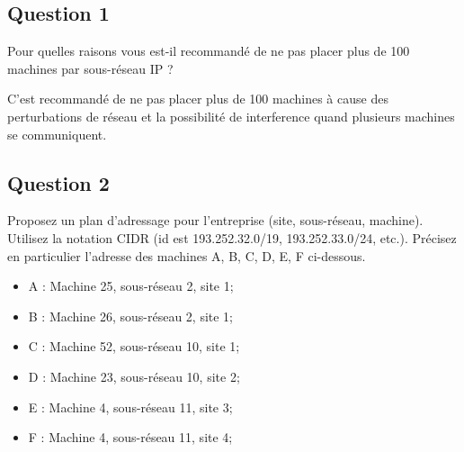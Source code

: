 \documentclass{article}
\begin{document}
\subsection*{Question 1}
\begin{exercise}
    Pour quelles raisons vous est-il recommandé de ne pas placer plus de 100 machines par sous-réseau IP ?
\end{exercise}
\begin{resolution}
    C'est recommandé de ne pas placer plus de 100 machines à cause des perturbations de réseau et la possibilité de interference quand plusieurs machines se communiquent.
\end{resolution}
    

\subsection*{Question 2}
\begin{exercise}
    Proposez un plan d'adressage pour l'entreprise (site, sous-réseau, machine). Utilisez la notation CIDR (id est 193.252.32.0/19, 193.252.33.0/24, etc.). Précisez en particulier l'adresse des machines A, B, C, D, E, F ci-dessous.
\begin{itemize}[noitemsep]
    \item A : Machine 25, sous-réseau 2, site 1;
    \item B : Machine 26, sous-réseau 2, site 1;
    \item C : Machine 52, sous-réseau 10, site 1;
    \item D : Machine 23, sous-réseau 10, site 2;
    \item E : Machine 4, sous-réseau 11, site 3;
    \item F : Machine 4, sous-réseau 11, site 4;
\end{itemize}
\end{exercise}
\begin{resolution}
    
\end{resolution}
\end{document}
